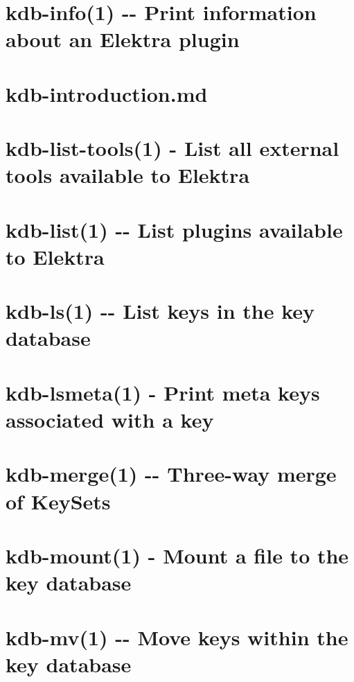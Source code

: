 \documentclass[twoside]{book}
\newcommand{\+}{\discretionary{\mbox{\scriptsize$\hookleftarrow$}}{}{}}
\begin{document}
\chapter{kdb-\/info(1) -\/-\/ Print information about an Elektra plugin}
\label{md_doc_help_kdb-info}
\hypertarget{md_doc_help_kdb-info}{}

\chapter{kdb-\/introduction.md}
\label{doc_help_kdb-introduction_md}
\hypertarget{doc_help_kdb-introduction_md}{}

\chapter{kdb-\/list-\/tools(1) -\/ List all external tools available to Elektra}
\label{md_doc_help_kdb-list-tools}
\hypertarget{md_doc_help_kdb-list-tools}{}

\chapter{kdb-\/list(1) -\/-\/ List plugins available to Elektra}
\label{md_doc_help_kdb-list}
\hypertarget{md_doc_help_kdb-list}{}

\chapter{kdb-\/ls(1) -\/-\/ List keys in the key database}
\label{md_doc_help_kdb-ls}
\hypertarget{md_doc_help_kdb-ls}{}

\chapter{kdb-\/lsmeta(1) -\/ Print meta keys associated with a key}
\label{md_doc_help_kdb-lsmeta}
\hypertarget{md_doc_help_kdb-lsmeta}{}

\chapter{kdb-\/merge(1) -\/-\/ Three-\/way merge of Key\+Sets}
\label{md_doc_help_kdb-merge}
\hypertarget{md_doc_help_kdb-merge}{}

\chapter{kdb-\/mount(1) -\/ Mount a file to the key database}
\label{md_doc_help_kdb-mount}
\hypertarget{md_doc_help_kdb-mount}{}

\chapter{kdb-\/mv(1) -\/-\/ Move keys within the key database}
\label{md_doc_help_kdb-mv}
\hypertarget{md_doc_help_kdb-mv}{}

\end{document}
